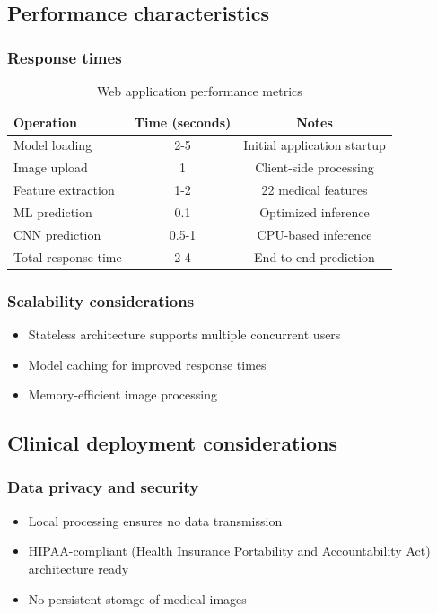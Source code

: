 \documentclass[11pt]{article}
\begin{document}
\subsection{Performance characteristics}

\subsubsection{Response times}
\begin{table}[H]
\centering
\caption{Web application performance metrics}
\begin{tabular}{lcc}
\toprule
\textbf{Operation} & \textbf{Time (seconds)} & \textbf{Notes} \\
\midrule
Model loading & 2-5 & Initial application startup \\
Image upload & 1 & Client-side processing \\
Feature extraction & 1-2 & 22 medical features \\
ML prediction & 0.1 & Optimized inference \\
CNN prediction & 0.5-1 & CPU-based inference \\
Total response time & 2-4 & End-to-end prediction \\
\bottomrule
\end{tabular}
\end{table}

\subsubsection{Scalability considerations}
\begin{itemize}
    \item Stateless architecture supports multiple concurrent users
    \item Model caching for improved response times
    \item Memory-efficient image processing
\end{itemize}

\subsection{Clinical deployment considerations}

\subsubsection{Data privacy and security}
\begin{itemize}
    \item Local processing ensures no data transmission
    \item HIPAA-compliant (Health Insurance Portability and Accountability Act) architecture ready
    \item No persistent storage of medical images
\end{itemize}
\end{document}
